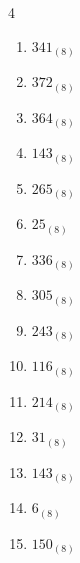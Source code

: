 \begin{multicols}{4}
\begin{enumerate}
        \phantom{$=64$}

  \item $341_{(8)}$

        \phantom{$=225$}

  \item $372_{(8)}$

        \phantom{$=250$}

  \item $364_{(8)}$

        \phantom{$=244$}

  \item $143_{(8)}$

        \phantom{$=99$}

  \item $265_{(8)}$

        \phantom{$=181$}

  \item $25_{(8)}$

        \phantom{$=21$}

  \item $336_{(8)}$

        \phantom{$=222$}

  \item $305_{(8)}$

        \phantom{$=197$}

  \item $243_{(8)}$

        \phantom{$=163$}

  \item $116_{(8)}$

        \phantom{$=78$}

  \item $214_{(8)}$

        \phantom{$=140$}

  \item $31_{(8)}$

        \phantom{$=25$}

  \item $143_{(8)}$

        \phantom{$=99$}

\columnbreak %

  \item $6_{(8)}$

        \phantom{$=6$}

  \item $150_{(8)}$

        \phantom{$=104$}


\end{enumerate}
\end{multicols}
